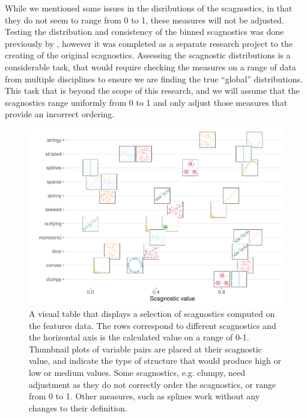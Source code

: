 While we mentioned some issues in the disributions of the scagnostics,
in that they do not seem to range from 0 to 1, these measures will not
be adjusted. Testing the distribution and consistency of the binned
scagnostics was done previously by \citet{scagdist}, however it was
completed as a separate research project to the creating of the original
scagnostics. Assessing the scagnostic distributions is a considerable
task, that would require checking the measures on a range of data from
multiple disciplines to ensure we are finding the true ``global''
distributions. This task that is beyond the scope of this research, and
we will assume that the scagnostics range uniformly from 0 to 1 and only
adjust those measures that provide an incorrect ordering.

\begin{Schunk}
\begin{figure}
\includegraphics[width=1\linewidth]{mason-lee-laa-cook_files/figure-latex/visual-table-1} \caption[A visual table that displays a selection of scagnostics computed on the features data]{A visual table that displays a selection of scagnostics computed on the features data. The rows correspond to different scagnostics and the horizontal axis is the calculated value on a range of 0-1. Thumbnail plots of variable pairs are placed at their scagnostic value, and indicate the type of structure that would produce high or low or medium values. Some scagnostics, e.g. clumpy, need adjustment as they do not correctly order the scagnostics, or range from 0 to 1. Other measures, such as splines work without any changes to their definition.}\label{fig:visual-table}
\end{figure}
\end{Schunk}

